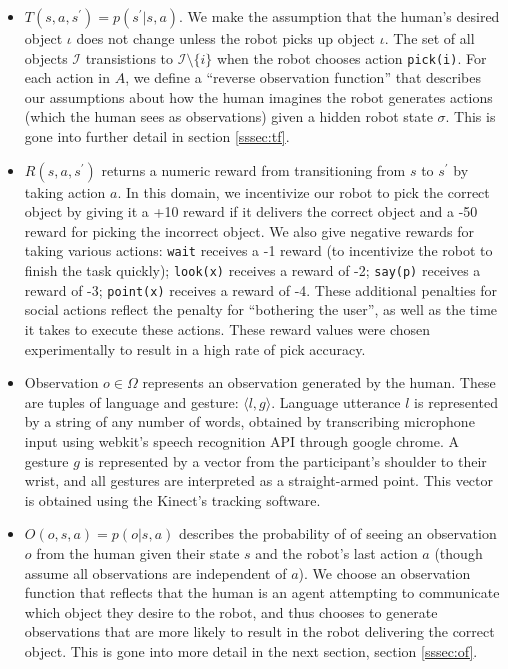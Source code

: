 \documentclass{article}
\newcommand{\Iota}{\mathcal{I}}
\begin{document}
\begin{multicols}{2}
\begin{itemize}
	\item $T(s, a, s^\prime) = p(s^\prime | s, a)$. We make the assumption that the human's desired object $\iota$ does not change unless the robot picks up object $\iota$. The set of all objects $\Iota$ transistions to $\Iota \setminus \{i\}$ when the robot chooses action \texttt{pick(i)}. For each action in $A$, we define a ``reverse observation function'' that describes our assumptions about how the human imagines the robot generates actions (which the human sees as observations) given a hidden robot state $\sigma$. This is gone into further detail in section  \ref{sssec:tf}. 
	\item $R(s, a, s^\prime)$ returns a numeric reward from transitioning from $s$ to $s^\prime$ by taking action $a$. In this domain, we incentivize our robot to pick the correct object by giving it a +10 reward if it delivers the correct object and a -50 reward for picking the incorrect object. We also give negative rewards for taking various actions: \texttt{wait} receives a -1 reward (to incentivize the robot to finish the task quickly); \texttt{look(x)} receives a reward of -2; \texttt{say(p)} receives a reward of -3; \texttt{point(x)}  receives a reward of -4. These additional penalties for social actions reflect the penalty for ``bothering the user'', as well as the time it takes to execute these actions. These reward values were chosen experimentally to result in a high rate of pick accuracy. 
	\item Observation $o \in \Omega$ represents an observation generated by the human. These are tuples of language and gesture: $\langle l, g \rangle$. Language utterance $l$ is represented by a string of any number of words, obtained by transcribing microphone input using webkit's speech recognition API through google chrome.  A gesture $g$ is represented by a vector from the participant's shoulder to their wrist, and all gestures are interpreted as a straight-armed point. This vector is obtained using the Kinect's tracking software. 
	\item $O(o, s, a) = p(o |s, a)$ describes the probability of of seeing an observation $o$ from the human given their state $s$ and the robot's last action $a$ (though assume all observations are independent of $a$). We choose an observation function that reflects that the human is an agent attempting to communicate which object they desire to the robot, and thus chooses to generate observations that are more likely to result in the robot delivering the correct object. This is gone into more detail in the next section, section \ref{sssec:of}. 
\end{itemize}



\end{multicols}
\end{document}
